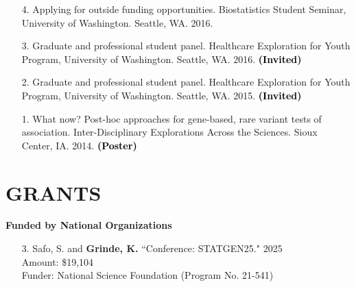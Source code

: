 \documentclass[margin]{res}
\newcommand{\annotate}[1]{\textcolor{black}{\textbf{(#1)}}}
\newcommand{\annotateItem}[1]{
	\begin{itemize} \vspace{-0.1cm}
	\item[] 
	\begin{footnotesize}\textcolor{black}{(#1)}\end{footnotesize}
	\end{itemize} \vspace{-0.1cm}
}
\begin{document}
\begin{resume}
\begin{itemize}
\item[4.] %
Applying for outside funding opportunities. 
Biostatistics Student Seminar, University of Washington. Seattle, WA. 2016.

\item[3.] Graduate and professional student panel. 
Healthcare Exploration for Youth Program, University of Washington. Seattle, WA. 2016. 
\annotate{Invited}

\item[2.] Graduate and professional student panel. 
Healthcare Exploration for Youth Program, University of Washington. Seattle, WA. 2015. 
\annotate{Invited}

\item[1.] %
What now? Post-hoc approaches for gene-based, rare variant tests of association. 
Inter-Disciplinary Explorations Across the Sciences. Sioux Center, IA. 2014.  
\annotate{Poster}\\%

\end{itemize}




\section{GRANTS}

\textbf{Funded by National Organizations}
\begin{itemize}
\item[3.] Safo, S. and \textbf{Grinde, K.} ``Conference: STATGEN25."  \hfill 2025 \\ 
Amount: \$19,104 \\ %
Funder: National Science Foundation (Program No. 21-541)
	

\end{itemize}
\end{resume}
\end{document}
